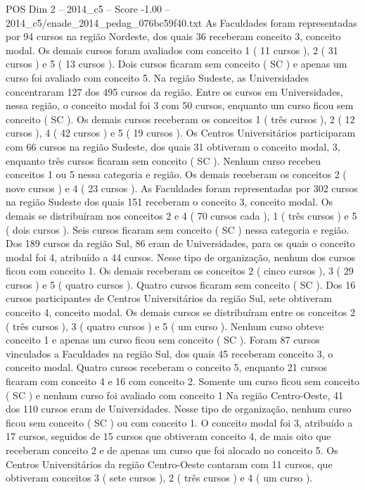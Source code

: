 \begin{textsample}{POS Dim 2 – 2014\_c5 – Score -1.00 – 2014\_c5/enade\_2014\_pedag\_076bc59f40.txt}
As Faculdades foram representadas por 94 cursos na região Nordeste, dos quais 36 receberam conceito 3, conceito modal.
Os demais cursos foram avaliados com conceito 1 ( 11 cursos ), 2 ( 31 cursos ) e 5 ( 13 cursos ).
Dois cursos ficaram sem conceito ( SC ) e apenas um curso foi avaliado com conceito 5.
Na região Sudeste, as Universidades concentraram 127 dos 495 cursos da região.
Entre os cursos em Universidades, nessa região, o conceito modal foi 3 com 50 cursos, enquanto um curso ficou sem conceito ( SC ).
Os demais cursos receberam os conceitos 1 ( três cursos ), 2 ( 12 cursos ), 4 ( 42 cursos ) e 5 ( 19 cursos ).
Os Centros Universitários participaram com 66 cursos na região Sudeste, dos quais 31 obtiveram o conceito modal, 3, enquanto três cursos ficaram sem conceito ( SC ).
Nenhum curso recebeu conceitos 1 ou 5 nessa categoria e região.
Os demais receberam os conceitos 2 ( nove cursos ) e 4 ( 23 cursos ).
As Faculdades foram representadas por 302 cursos na região Sudeste dos quais 151 receberam o conceito 3, conceito modal.
Os demais se distribuíram nos conceitos 2 e 4 ( 70 cursos cada ), 1 ( três cursos ) e 5 ( dois cursos ).
Seis cursos ficaram sem conceito ( SC ) nessa categoria e região.
Dos 189 cursos da região Sul, 86 eram de Universidades, para os quais o conceito modal foi 4, atribuído a 44 cursos.
Nesse tipo de organização, nenhum dos cursos ficou com conceito 1.
Os demais receberam os conceitos 2 ( cinco cursos ), 3 ( 29 cursos ) e 5 ( quatro cursos ).
Quatro cursos ficaram sem conceito ( SC ).
Dos 16 cursos participantes de Centros Universitários da região Sul, sete obtiveram conceito 4, conceito modal.
Os demais cursos se distribuíram entre os conceitos 2 ( três cursos ), 3 ( quatro cursos ) e 5 ( um curso ).
Nenhum curso obteve conceito 1 e apenas um curso ficou sem conceito ( SC ).
Foram 87 cursos vinculados a Faculdades na região Sul, dos quais 45 receberam conceito 3, o conceito modal.
Quatro cursos receberam o conceito 5, enquanto 21 cursos ficaram com conceito 4 e 16 com conceito 2.
Somente um curso ficou sem conceito ( SC ) e nenhum curso foi avaliado com conceito 1 Na região Centro-Oeste, 41 dos 110 cursos eram de Universidades.
Nesse tipo de organização, nenhum curso ficou sem conceito ( SC ) ou com conceito 1.
O conceito modal foi 3, atribuído a 17 cursos, seguidos de 15 cursos que obtiveram conceito 4, de mais oito que receberam conceito 2 e de apenas um curso que foi alocado no conceito 5.
Os Centros Universitários da região Centro-Oeste contaram com 11 cursos, que obtiveram conceitos 3 ( sete cursos ), 2 ( três cursos ) e 4 ( um curso ).

\end{textsample}
